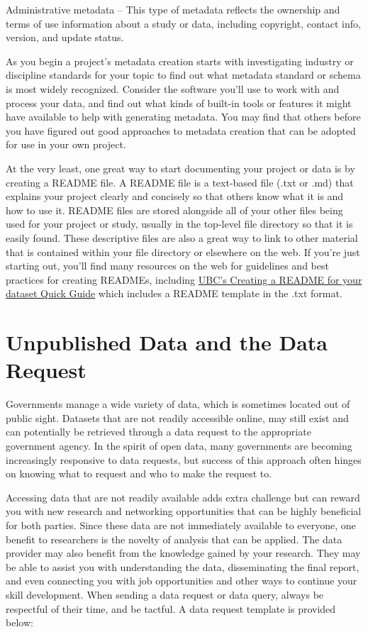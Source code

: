\documentclass[
]{book}
\begin{document}
Administrative metadata -- This type of metadata reflects the ownership and terms of use information about a study or data, including copyright, contact info, version, and update status.

As you begin a project's metadata creation starts with investigating industry or discipline standards for your topic to find out what metadata standard or schema is most widely recognized. Consider the software you'll use to work with and process your data, and find out what kinds of built-in tools or features it might have available to help with generating metadata. You may find that others before you have figured out good approaches to metadata creation that can be adopted for use in your own project.

At the very least, one great way to start documenting your project or data is by creating a README file. A README file is a text-based file (.txt or .md) that explains your project clearly and concisely so that others know what it is and how to use it. README files are stored alongside all of your other files being used for your project or study, usually in the top-level file directory so that it is easily found. These descriptive files are also a great way to link to other material that is contained within your file directory or elsewhere on the web. If you're just starting out, you'll find many resources on the web for guidelines and best practices for creating READMEs, including \href{https://osf.io/aqxw3}{UBC's Creating a README for your dataset Quick Guide} which includes a README template in the .txt format.

\hypertarget{unpublished-data-and-the-data-request}{%
\section{Unpublished Data and the Data Request}\label{unpublished-data-and-the-data-request}}

Governments manage a wide variety of data, which is sometimes located out of public sight. Datasets that are not readily accessible online, may still exist and can potentially be retrieved through a data request to the appropriate government agency. In the spirit of open data, many governments are becoming increasingly responsive to data requests, but success of this approach often hinges on knowing what to request and who to make the request to.

Accessing data that are not readily available adds extra challenge but can reward you with new research and networking opportunities that can be highly beneficial for both parties. Since these data are not immediately available to everyone, one benefit to researchers is the novelty of analysis that can be applied. The data provider may also benefit from the knowledge gained by your research. They may be able to assist you with understanding the data, disseminating the final report, and even connecting you with job opportunities and other ways to continue your skill development. When sending a data request or data query, always be respectful of their time, and be tactful. A data request template is provided below:
\end{document}
